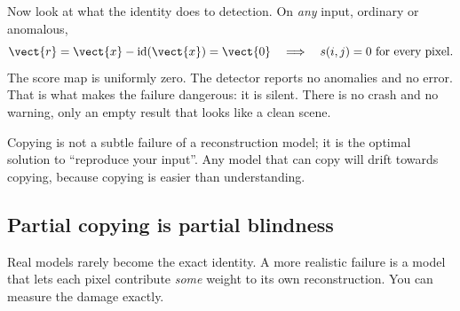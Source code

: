 Now look at what the identity does to detection. On \emph{any} input, ordinary or anomalous,
\begin{equation}
\vect{r} = \vect{x} - \mathrm{id}(\vect{x}) = \vect{0}
\quad\Longrightarrow\quad s(i,j)=0 \ \text{for every pixel}.
\end{equation}
The score map is uniformly zero. The detector reports no anomalies and no error. That is what makes
the failure dangerous: it is silent. There is no crash and no warning, only an empty result that looks
like a clean scene.

\begin{keypoint}
Copying is not a subtle failure of a reconstruction model; it is the optimal solution to ``reproduce
your input''. Any model that can copy will drift towards copying, because copying is easier than
understanding.
\end{keypoint}

\subsection{Partial copying is partial blindness}\label{sec:recon:partial}

Real models rarely become the exact identity. A more realistic failure is a model that lets each
pixel contribute \emph{some} weight to its own reconstruction. You can measure the damage exactly.

